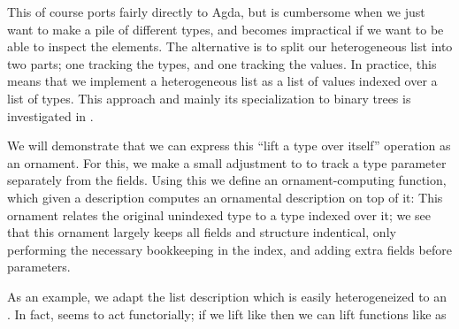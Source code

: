 This of course ports fairly directly to Agda, but is cumbersome when we just want to make a pile of different types, and becomes impractical if we want to be able to inspect the elements. The alternative is to split our heterogeneous list into two parts; one tracking the types, and one tracking the values. In practice, this means that we implement a heterogeneous list as a list of values indexed over a list of types. This approach and mainly its specialization to binary trees is investigated in \cite{hetbin}.

We will demonstrate that we can express this ``lift a type over itself'' operation as an ornament. For this, we make a small adjustment to  to track a type parameter separately from the fields. Using this we define an ornament-computing function, which given a description computes an ornamental description on top of it:
This ornament relates the original unindexed type to a type indexed over it; we see that this ornament largely keeps all fields and structure indentical, only performing the necessary bookkeeping in the index, and adding extra fields before parameters.

As an example, we adapt the list description
which is easily heterogeneized to an . In fact,  seems to act functorially; if we lift  like
then we can lift functions like  as


